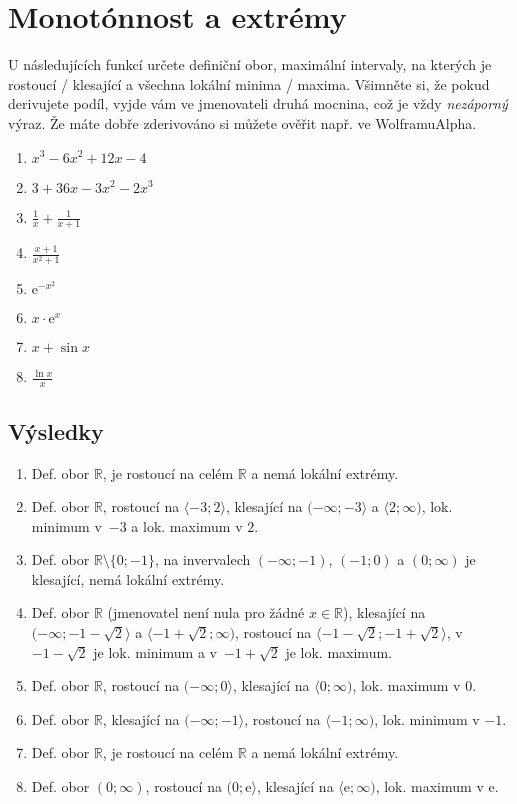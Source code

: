 \documentclass[12pt,a4paper]{article}
\theoremstyle{definition}
\def\ee{\mathrm{e}}
\def\R{\mathbb R}
\begin{document}
\section*{Monotónnost a extrémy}

U následujících funkcí určete definiční obor, maximální intervaly, na kterých je rostoucí / klesající a všechna lokální minima / maxima. Všimněte si, že pokud derivujete podíl, vyjde vám ve jmenovateli druhá mocnina, což je vždy \emph{nezáporný} výraz. Že máte dobře zderivováno si můžete ověřit např. ve WolframuAlpha.
\begin{enumerate}[itemsep=\bigskipamount]
	\everymath{\displaystyle}
	\item $x^3 - 6x^2 + 12x - 4$
	\item $3 + 36 x - 3 x^2 - 2 x^3$
	\item $\frac1x + \frac{1}{x+1}$
	\item $\frac{x+1}{x^2+1}$
	\item $\ee^{-x^2}$
	\item $x \cdot \ee^x$
	\item $x + \sin x$
	\item $\frac{\ln x}{x}$
\end{enumerate}

\newpage

\subsection*{Výsledky}

\begin{enumerate}[itemsep=\bigskipamount]
	\everymath{\displaystyle}
	\item Def. obor $\R$, je rostoucí na celém $\R$ a nemá lokální extrémy.
	\item Def. obor $\R$, rostoucí na $\langle -3; 2\rangle$, klesající na $(-\infty; -3\rangle$ a $\langle2; \infty)$, lok. minimum v~$-3$ a lok. maximum v $2$.
	\item Def. obor $\R \setminus\{0;-1\}$, na invervalech $(-\infty;-1)$, $(-1;0)$ a $(0;\infty)$ je klesající, nemá lokální extrémy.
	\item Def. obor $\R$ (jmenovatel není nula pro žádné $x \in \R$), klesající na $(-\infty;-1-\sqrt2\rangle$ a $\langle -1+\sqrt2; \infty)$, rostoucí na $\langle-1-\sqrt2;-1+\sqrt2\rangle$, v $-1-\sqrt2$ je lok. minimum a v~$-1+\sqrt2$ je lok. maximum.
	\item Def. obor $\R$, rostoucí na $(-\infty;0\rangle$, klesající na $\langle0;\infty)$, lok. maximum v $0$.
	\item Def. obor $\R$, klesající na $(-\infty; -1\rangle$, rostoucí na $\langle-1; \infty)$, lok. minimum v $-1$.
	\item Def. obor $\R$, je rostoucí na celém $\R$ a nemá lokální extrémy.
	\item Def. obor $(0;\infty)$, rostoucí na $(0; \ee\rangle$, klesající na $\langle\ee; \infty)$, lok. maximum v $\ee$.
\end{enumerate}
\end{document}
